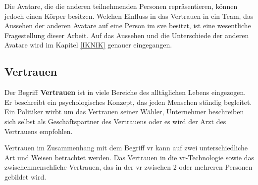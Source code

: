 \documentclass[a4paper,11pt]{article}%
\renewcommand{\\}{\vspace*{0.5\baselineskip} \newline}
\begin{document}
Die Avatare, die die \dq{}anderen\dq{} teilnehmenden Personen repräsentieren, können jedoch einen Körper besitzen.
Welchen Einfluss in das Vertrauen in ein Team, das Aussehen der \dq{}anderen\dq{} Avatare auf eine Person im \ac{sve} besitzt, ist eine wesentliche Fragestellung dieser Arbeit. Auf das Aussehen und die Unterschiede der \dq{}anderen\dq{} Avatare wird im Kapitel \ref{IKNIK} genauer eingegangen.


%




	





\newpage

	\subsection{Vertrauen}
	\label{Vertrauen}
Der Begriff \textbf{Vertrauen} ist in viele Bereiche des alltäglichen Lebens eingezogen. Er beschreibt ein psychologisches Konzept, das jeden Menschen ständig begleitet.
Ein Politiker wirbt um das Vertrauen seiner Wähler, Unternehmer beschreiben sich selbst als Geschäftspartner des Vertrauens oder es wird der \dq{}Arzt des Vertrauens\dq{} empfohlen.

Vertrauen im Zusammenhang mit dem Begriff \dq{}\ac{vr}\dq{} kann auf zwei unterschiedliche Art und Weisen betrachtet werden. Das Vertrauen in die \ac{vr}-Technologie sowie das zwischenmenschliche Vertrauen, das in der \ac{vr} zwischen 2 oder mehreren Personen gebildet wird.
\end{document}
